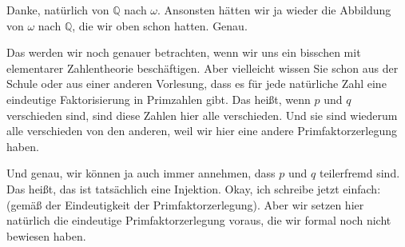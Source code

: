 \begin{spoken-clean}[00:33:40 - 00:34:04]
Danke, natürlich von $\mathbb{Q}$ nach $\omega$. Ansonsten hätten wir ja wieder die Abbildung von $\omega$ nach $\mathbb{Q}$, die wir oben schon hatten. Genau.
\end{spoken-clean}

\begin{spoken-clean}[00:34:04 - 00:35:33]
Das werden wir noch genauer betrachten, wenn wir uns ein bisschen mit elementarer Zahlentheorie beschäftigen. Aber vielleicht wissen Sie schon aus der Schule oder aus einer anderen Vorlesung, dass es für jede natürliche Zahl eine eindeutige Faktorisierung in Primzahlen gibt. Das heißt, wenn $p$ und $q$ verschieden sind, sind diese Zahlen hier alle verschieden. Und sie sind wiederum alle verschieden von den anderen, weil wir hier eine andere Primfaktorzerlegung haben.

Und genau, wir können ja auch immer annehmen, dass $p$ und $q$ teilerfremd sind. Das heißt, das ist tatsächlich eine Injektion. Okay, ich schreibe jetzt einfach:  (gemäß der Eindeutigkeit der Primfaktorzerlegung). Aber wir setzen hier natürlich die eindeutige Primfaktorzerlegung voraus, die wir formal noch nicht bewiesen haben.
\end{spoken-clean}

